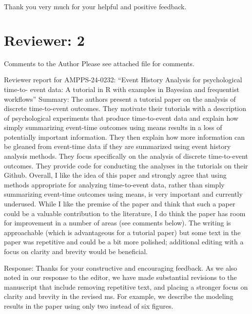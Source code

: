 \documentclass[
]{article}
\renewenvironment{quote}{\begin{leftbar}}{\end{leftbar}}
\begin{document}
Thank you very much for your helpful and positive feedback.

\section{Reviewer: 2}\label{reviewer-2}

\begin{quote}
Comments to the Author Please see attached file for comments.
\end{quote}

\begin{quote}
Reviewer report for AMPPS-24-0232: ``Event History Analysis for
psychological time-to- event data: A tutorial in R with examples in
Bayesian and frequentist workflows'' Summary: The authors present a
tutorial paper on the analysis of discrete time-to-event outcomes. They
motivate their tutorials with a description of psychological experiments
that produce time-to-event data and explain how simply summarizing
event-time outcomes using means results in a loss of potentially
important information. They then explain how more information can be
gleaned from event-time data if they are summarized using event history
analysis methods. They focus specifically on the analysis of discrete
time-to-event outcomes. They provide code for conducting the analyses in
the tutorials on their Github. Overall, I like the idea of this paper
and strongly agree that using methods appropriate for analyzing
time-to-event data, rather than simply summarizing event-time outcomes
using means, is very important and currently underused. While I like the
premise of the paper and think that such a paper could be a valuable
contribution to the literature, I do think the paper has room for
improvement in a number of areas (see comments below). The writing is
approachable (which is advantageous for a tutorial paper) but some text
in the paper was repetitive and could be a bit more polished; additional
editing with a focus on clarity and brevity would be beneficial.
\end{quote}

Response: Thanks for your constructive and encouraging feedback. As we
also noted in our response to the editor, we have made substantial
revisions to the manuscript that include removing repetitive text, and
placing a stronger focus on clarity and brevity in the revised ms. For
example, we describe the modeling results in the paper using only two
instead of six figures.
\end{document}
